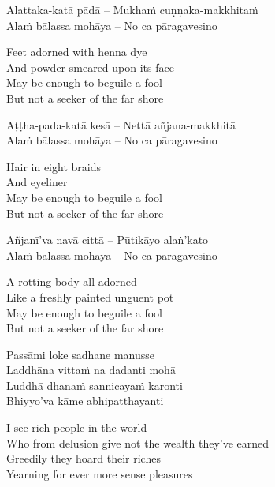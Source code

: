 \begin{verses}
  Alattaka-katā pādā – Mukhaṁ cuṇṇaka-makkhitaṁ\\
  Alaṁ bālassa mohāya – No ca pāragavesino
\end{verses}

\begin{english-verses}
  Feet adorned with henna dye\\
  And powder smeared upon its face\\
  May be enough to beguile a fool\\
  But not a seeker of the far shore
\end{english-verses}

\begin{verses}
  Aṭṭha-pada-katā kesā – Nettā añjana-makkhitā\\
  Alaṁ bālassa mohāya – No ca pāragavesino
\end{verses}

\begin{english-verses}
  Hair in eight braids\\
  And eyeliner\\
  May be enough to beguile a fool\\
  But not a seeker of the far shore
\end{english-verses}

\begin{verses}
  Añjanī'va navā cittā – Pūtikāyo alaṅ'kato\\
  Alaṁ bālassa mohāya – No ca pāragavesino
\end{verses}

\begin{english-verses}
  A rotting body all adorned\\
  Like a freshly painted unguent pot\\
  May be enough to beguile a fool\\
  But not a seeker of the far shore
\end{english-verses}

\begin{verses}
  Passāmi loke sadhane manusse\\
  Laddhāna vittaṁ na dadanti mohā\\
  Luddhā dhanaṁ sannicayaṁ karonti\\
  Bhiyyo'va kāme abhipatthayanti
\end{verses}

\begin{english-verses}
  I see rich people in the world\\
  Who from delusion give not the wealth they've earned\\
  Greedily they hoard their riches\\
  Yearning for ever more sense pleasures
\end{english-verses}

